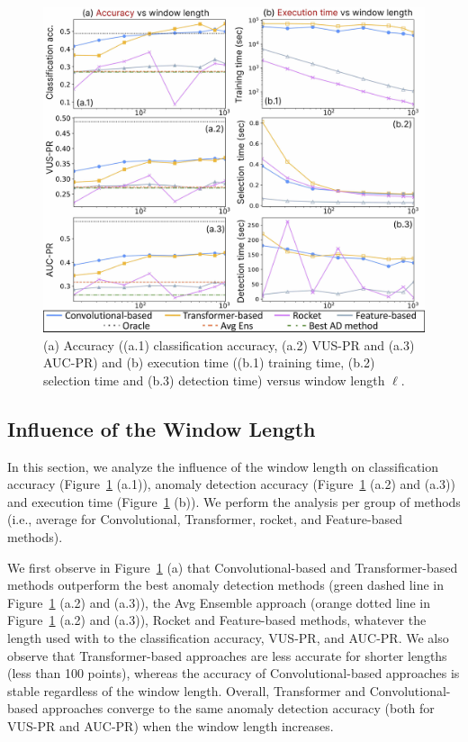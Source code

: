 \begin{figure}
    \centering
    \includegraphics[width=0.92\linewidth]{figures/8_window_length.jpg}
    \vspace{-0.3cm}
    \caption{(a) Accuracy ((a.1) classification accuracy, (a.2) VUS-PR and (a.3) AUC-PR) and (b) execution time ((b.1) training time, (b.2) selection time and (b.3) detection time) versus window length $\ell$.}
    \vspace{-0.3cm}
    \label{fig:lengthinfl}
\end{figure}

\subsection{Influence of the Window Length}
\label{exp:windowlength}


In this section, we analyze the influence of the window length on classification accuracy (Figure~\ref{fig:lengthinfl} (a.1)), anomaly detection accuracy (Figure~\ref{fig:lengthinfl} (a.2) and (a.3)) and execution time (Figure~\ref{fig:lengthinfl} (b)). We perform the analysis per group of methods (i.e., average for Convolutional, Transformer, rocket, and Feature-based methods).

We first observe in Figure~\ref{fig:lengthinfl} (a) that Convolutional-based and Transformer-based methods outperform the best anomaly detection methods (green dashed line in Figure~\ref{fig:lengthinfl} (a.2) and (a.3)), the Avg Ensemble approach (orange dotted line in Figure~\ref{fig:lengthinfl} (a.2) and (a.3)), Rocket and Feature-based methods, whatever the length used with  to the classification accuracy, VUS-PR, and AUC-PR. We also observe that Transformer-based approaches are less accurate for shorter lengths (less than 100 points), whereas the accuracy of Convolutional-based approaches is stable regardless of the window length. Overall, Transformer and Convolutional-based approaches converge to the same anomaly detection accuracy (both for VUS-PR and AUC-PR) when the window length increases.

